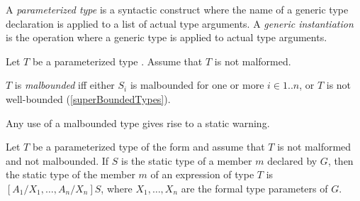 \documentclass{article}
\begin{document}
%
%
%

\LMHash{}
A \emph{parameterized type} is a syntactic construct where the name of a generic type declaration is applied to a list of actual type arguments.
A \emph{generic instantiation} is the operation where a generic type is applied to actual type arguments.


\LMHash{}
Let $T$ be a parameterized type .
Assume that $T$ is not malformed.


\LMHash{}
$T$ is {\em malbounded} if{}f either
$S_i$ is malbounded for one or more $i \in 1 .. n$,
or $T$ is not well-bounded (\ref{superBoundedTypes}).

\LMHash{}
Any use of a malbounded type gives rise to a static warning.

\LMHash{}
Let $T$ be a parameterized type of the form
and assume that $T$ is not malformed and not malbounded.
If $S$ is the static type of a member $m$ declared by $G$,
then the static type of the member $m$ of an expression of type $T$ is
$[A_1/X_1, \ldots, A_n/X_n]S$,
where $X_1, \ldots, X_n$ are the formal type parameters of $G$.
\end{document}
